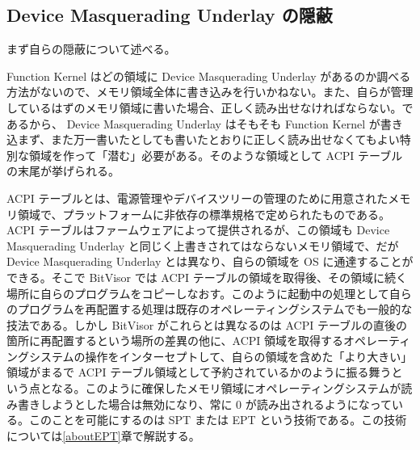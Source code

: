 \documentclass[a4paper,11pt,report]{ltjsbook}
\begin{document}
\subsection{Device Masquerading Underlay の隠蔽}

まず自らの隠蔽について述べる。

Function Kernel はどの領域に Device Masquerading Underlay があるのか調べる方法がないので、メモリ領域全体に書き込みを行いかねない。また、自らが管理しているはずのメモリ領域に書いた場合、正しく読み出せなければならない。であるから、 Device Masquerading Underlay はそもそも Function Kernel が書き込まず、また万一書いたとしても書いたとおりに正しく読み出せなくてもよい特別な領域を作って「潜む」必要がある。そのような領域として ACPI テーブルの末尾が挙げられる。

ACPI テーブルとは、電源管理やデバイスツリーの管理のために用意されたメモリ領域で、プラットフォームに非依存の標準規格で定められたものである。 ACPI テーブルはファームウェアによって提供されるが、この領域も Device Masquerading Underlay と同じく上書きされてはならないメモリ領域で、だが Device Masquerading Underlay とは異なり、自らの領域を OS に通達することができる。そこで BitVisor では ACPI テーブルの領域を取得後、その領域に続く場所に自らのプログラムをコピーしなおす。このように起動中の処理として自らのプログラムを再配置する処理は既存のオペレーティングシステムでも一般的な技法である。しかし BitVisor がこれらとは異なるのは ACPI テーブルの直後の箇所に再配置するという場所の差異の他に、ACPI 領域を取得するオペレーティングシステムの操作をインターセプトして、自らの領域を含めた「より大きい」領域がまるで ACPI テーブル領域として予約されているかのように振る舞うという点となる。このように確保したメモリ領域にオペレーティングシステムが読み書きしようとした場合は無効になり、常に 0 が読み出されるようになっている。このことを可能にするのは SPT または EPT という技術である。この技術については\ref{aboutEPT}章で解説する。
\end{document}
